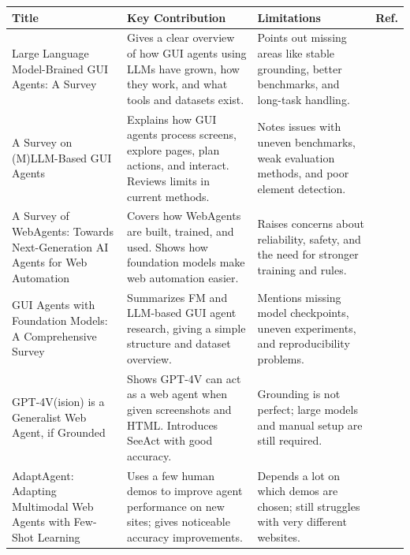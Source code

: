 \begin{table}[!h]
\small
\centering
\begin{tabularx}{\textwidth}{X|X|X|c}
\hline
\textbf{Title} & \textbf{Key Contribution} & \textbf{Limitations} & \textbf{Ref.} \\
\hline

Large Language Model-Brained GUI Agents: A Survey &
Gives a clear overview of how GUI agents using LLMs have grown, how they work, and what tools and datasets exist. &
Points out missing areas like stable grounding, better benchmarks, and long-task handling. 
& \cite{zhang2025largelanguagemodelbrainedgui} \\
\hline

A Survey on (M)LLM-Based GUI Agents &
Explains how GUI agents process screens, explore pages, plan actions, and interact. Reviews limits in current methods. &
Notes issues with uneven benchmarks, weak evaluation methods, and poor element detection. 
& \cite{tang2025surveymllmbasedguiagents} \\
\hline

A Survey of WebAgents: Towards Next-Generation AI Agents for Web Automation &
Covers how WebAgents are built, trained, and used. Shows how foundation models make web automation easier. &
Raises concerns about reliability, safety, and the need for stronger training and rules. 
& \cite{ning2025surveywebagentsnextgenerationai} \\
\hline

GUI Agents with Foundation Models: A Comprehensive Survey &
Summarizes FM and LLM-based GUI agent research, giving a simple structure and dataset overview. &
Mentions missing model checkpoints, uneven experiments, and reproducibility problems. 
& \cite{wang2025guiagentsfoundationmodels} \\
\hline

GPT-4V(ision) is a Generalist Web Agent, if Grounded &
Shows GPT-4V can act as a web agent when given screenshots and HTML. Introduces SeeAct with good accuracy. &
Grounding is not perfect; large models and manual setup are still required.
& \cite{SeeAct} \\
\hline

AdaptAgent: Adapting Multimodal Web Agents with Few-Shot Learning &
Uses a few human demos to improve agent performance on new sites; gives noticeable accuracy improvements. &
Depends a lot on which demos are chosen; still struggles with very different websites.
& \cite{FewShotLearning:verma2024adaptagentadaptingmultimodalweb} \\
\hline


\end{tabularx}
\end{table}
